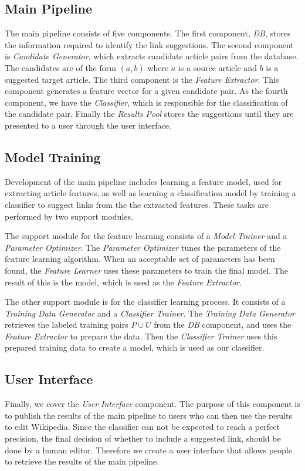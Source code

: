 \subsection{Main Pipeline}
The main pipeline consists of five components. The first component, \emph{DB}, stores the information required to identify the link suggestions. The second component is \emph{Candidate Generator}, which extracts candidate article pairs from the database. The candidates are of the form $(a,b)$ where $a$ is a source article and $b$ is a suggested target article. The third component is the \emph{Feature Extractor}. This component generates a feature vector for a given candidate pair. As the fourth component, we have the \emph{Classifier}, which is responsible for the classification of the candidate pair. Finally the \emph{Results Pool} stores the suggestions until they are presented to a user through the user interface.

\subsection{Model Training}
Development of the main pipeline includes learning a feature model, used for extracting article features, as well as learning a classification model by training a classifier to suggest links from the the extracted features. These tasks are performed by two support modules.

The support module for the feature learning consists of a \emph{Model Trainer} and a \emph{Parameter Optimizer}. The \emph{Parameter Optimizer} tunes the parameters of the feature learning algorithm. When an acceptable set of parameters has been found, the \emph{Feature Learner} uses these parameters to train the final model. The result of this is the model, which is used as the \emph{Feature Extractor}.

The other support module is for the classifier learning process. It consists of a \emph{Training Data Generator} and a \emph{Classifier Trainer}. The \emph{Training Data Generator} retrieves the labeled training pairs $P \cup U$ from the \emph{DB} component, and uses the \emph{Feature Extractor} to prepare the data. Then the \emph{Classifier Trainer} uses this prepared training data to create a model, which is used as our classifier.

\subsection{User Interface}
Finally, we cover the \emph{User Interface} component. The purpose of this component is to publish the results of the main pipeline to users who can then use the results to edit Wikipedia. Since the classifier can not be expected to reach a perfect precision, the final decision of whether to include a suggested link, should be done by a human editor. Therefore we create a user interface that allows people to retrieve the results of the main pipeline.


